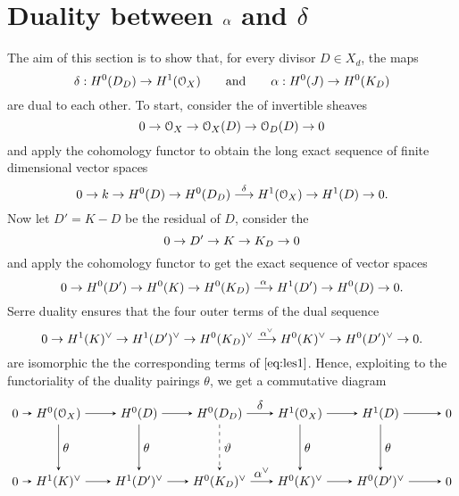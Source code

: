 \section{Duality between $\alpha$ and $\delta$}\label{sec:alpha_delta}

	The aim of this section is to show that, for every divisor $D\in X_d$, the maps
	$$ \delta:H^0(D_D)\to H^1(\mathcal{O}_X) \qquad \text{and} \qquad \alpha:H^0(J)\to H^0(K_D) $$
	are dual to each other.
	To start, consider the \ses of invertible sheaves 
	$$ 0 \to \mathcal{O}_X \to \mathcal{O}_X(D) \to \mathcal{O}_D(D) \to 0 $$
	and apply the cohomology functor to obtain the long exact sequence of finite dimensional vector spaces
	\begin{equation}\label{eq:les1}
		0\to k \to H^0(D) \to H^0(D_D) \overset{\delta}\longrightarrow H^1(\mathcal{O}_X) \to H^1(D) \to 0.
	\end{equation}
	Now let $D'=K-D$ be the residual of $D$, consider the \ses
	$$ 0 \to D' \to K \to K_D \to 0 $$
	and apply the cohomology functor to get the exact sequence of vector spaces
	$$ 0\to H^0(D') \to H^0(K) \to H^0(K_D) \overset{\alpha}\longrightarrow H^1(D') \to H^0(D) \to 0. $$
	Serre duality ensures that the four outer terms of the dual sequence
	$$ 0\to H^1(K)^{\vee} \to H^1(D')^{\vee} \to H^0(K_D)^{\vee} \overset{\alpha^{\vee}}\longrightarrow H^0(K)^{\vee} \to H^0(D')^{\vee} \to 0. $$
	are isomorphic the the corresponding terms of $\ref{eq:les1}$. Hence, exploiting to the functoriality of the duality pairings $\theta$, we get a commutative diagram
	$$
		\begin{tikzpicture}[node distance=6.5em, auto]
			\node 					(01) 																{$0$};
			\node 					(A) 	[right of=01, xshift=-3em]		{$H^0(\OX)$};
			\node 					(B) 	[right of=A, xshift=-0em]			{$H^0(D)$};
			\node 					(C) 	[right of=B]									{$H^0(D_D)$};
			\node 					(D) 	[right of=C]									{$H^1(\OX)$};
		  \node 					(E) 	[right of=D]									{$H^1(D)$};
			\node 					(02) 	[right of=E, xshift=-1em]			{$0$};
			\node 					(01') [below of=01, yshift=1em]		{$0$};
			\node 					(A') 	[right of=01', xshift=-3em]		{$H^1(K)^{\vee}$};
			\node 					(B') 	[right of=A', xshift=-0em]		{$H^1(D')^{\vee}$};
			\node 					(C') 	[right of=B']									{$H^0(K_D)^{\vee}$};
			\node 					(D') 	[right of=C']									{$H^0(K)^{\vee}$};
		  \node 					(E') 	[right of=D']									{$H^0(D')^{\vee}$};
			\node 					(02') [right of=E', xshift=-1em]		{$0$};
		  \draw[-stealth]	(01)		to node {$\;$} 		(A);
		  \draw[-stealth]	(A)			to node {$\;$} 		(B);
		  \draw[-stealth]	(B)			to node {$\;$}	 	(C);
		  \draw[-stealth]	(C)			to node {$\delta$}(D);
		  \draw[-stealth]	(D)			to node {$\;$} 		(E);
		  \draw[-stealth]	(E)			to node {$\;$} 		(02);
		  \draw[-stealth][swap]	(01')		to node {$\;$} 		(A');
		  \draw[-stealth][swap]	(A')		to node {$\;$} 		(B');
		  \draw[-stealth][swap]	(B')		to node {$\;$}	 	(C');
		 	\draw[-stealth][]	(C')				to node {$\al^{\vee}$} 	(D');
		  \draw[-stealth][swap]	(D')		to node {$\;$} 		(E');
		  \draw[-stealth][swap]	(E')		to node {$\;$} 		(02');
		  \draw[-stealth]	(A)							to node {$\theta$} 		(A');
		  \draw[-stealth]	(B)							to node {$\theta$}	 	(B');
		  \draw[-stealth, dashed]	(C)			to node {$\vartheta$} 		(C');
		  \draw[-stealth]	(D)							to node {$\theta$} 	(D');
		  \draw[-stealth]	(E)							to node {$\theta$} 		(E');
		\end{tikzpicture}
	$$
